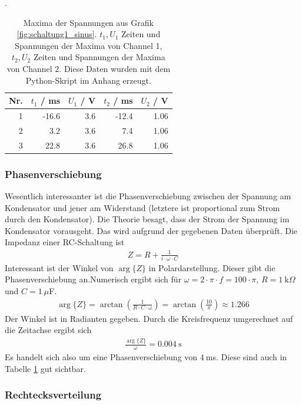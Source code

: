 \documentclass{article}
\begin{document}
\begin{table}[H]
\caption{Maxima der Spannungen  aus Grafik \ref{fig:schaltung1_sinus}. $t_1, U_1$ Zeiten und Spannungen der Maxima von Channel 1,  $t_2, U_2$ Zeiten und Spannungen der Maxima von Channel 2. Diese Daten wurden mit dem Python-Skript im Anhang erzeugt.}.
\label{tab:minmax}
\begin{tabular}{r|rr|rr}
Nr. & $t_1$ / ms & $U_1$ / V & $t_2$ / ms & $U_2$ / V \\
\hline
1 & -16.6 & 3.6 & -12.4 & 1.06\\
2 & 3.2 & 3.6  & 7.4 & 1.06\\
3 & 22.8 & 3.6 & 26.8 & 1.06
\end{tabular}
\end{table}



\subsubsection{Phasenverschiebung}

Wesentlich interessanter ist die Phasenverschiebung zwischen der Spannung am Kondensator und jener am Widerstand (letztere ist proportional zum Strom durch den Kondensator). Die Theorie besagt, dass der Strom der Spannung im Kondensator vorausgeht. Das wird aufgrund der gegebenen Daten überprüft. Die Impedanz einer RC-Schaltung ist
\begin{align*}
Z = R + \frac{1}{i\cdot \omega\cdot C}
\end{align*}
Interessant ist der Winkel von $\operatorname{arg}\{Z\}$ in Polardarstellung. Dieser gibt die Phasenverschiebung an.Numerisch ergibt sich für $\omega = 2\cdot\pi\cdot f = 100\cdot \pi$, $R=1~$k$\Omega$ und $C=1~\mu$F.
\begin{align*}
\operatorname{arg}\{Z\} = \operatorname{arctan}\left(\frac{1}{R\cdot C\cdot \omega}\right) = \operatorname{arctan}\left( \frac{10}{\pi}\right) \approx 1.266
\end{align*}
Der Winkel ist in Radianten gegeben. Durch die Kreisfrequenz umgerechnet auf die Zeitachse ergibt sich
\begin{align*}
\frac{\operatorname{arg}\{Z\}}{\omega} = 0.004~\text{s}
\end{align*}
Es handelt sich also um eine Phasenverschiebung von $4~$ms. Diese sind auch in Tabelle \ref{tab:minmax} gut sichtbar.





\subsubsection{Rechtecksverteilung}
\end{document}
